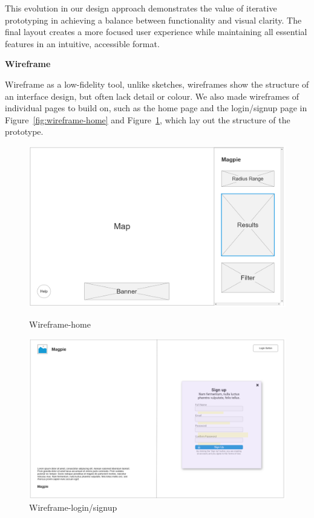This evolution in our design approach demonstrates the value of iterative prototyping in achieving a balance between functionality and visual clarity. The final layout creates a more focused user experience while maintaining all essential features in an intuitive, accessible format.

\item \textbf{Wireframe}

Wireframe as a low-fidelity tool, unlike sketches, wireframes show the structure of an interface design, but often lack detail or colour. We also made wireframes of individual pages to build on, such as the home page and the login/signup page in Figure~\ref{fig:wireframe-home} and Figure~\ref{fig:wireframe-signup}, which lay out the structure of the prototype.

\begin{figure}[h]
    \centering
    \begin{minipage}{0.48\textwidth}
        \centering
        \includegraphics[width=\textwidth]{images/wireframe-home.jpg}
        \caption{Wireframe-home}
        \label{fig:wireframe-home}
    \end{minipage}
    \hfill
    \begin{minipage}{0.48\textwidth}
        \centering
        \includegraphics[width=\textwidth]{images/wireframe-signup.jpg}
        \caption{Wireframe-login/signup}
        \label{fig:wireframe-signup}
    \end{minipage}
\end{figure}

